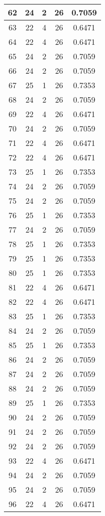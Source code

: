 \documentclass[letterpaper, 12pt]{article}
\begin{document}
\begin{longtable}{|c|c|c|c|c|}
\hline
62 & 24 & 2 & 26 & 0.7059 \\
\hline
63 & 22 & 4 & 26 & 0.6471 \\
\hline
64 & 22 & 4 & 26 & 0.6471 \\
\hline
65 & 24 & 2 & 26 & 0.7059 \\
\hline
66 & 24 & 2 & 26 & 0.7059 \\
\hline
67 & 25 & 1 & 26 & 0.7353 \\
\hline
68 & 24 & 2 & 26 & 0.7059 \\
\hline
69 & 22 & 4 & 26 & 0.6471 \\
\hline
70 & 24 & 2 & 26 & 0.7059 \\
\hline
71 & 22 & 4 & 26 & 0.6471 \\
\hline
72 & 22 & 4 & 26 & 0.6471 \\
\hline
73 & 25 & 1 & 26 & 0.7353 \\
\hline
74 & 24 & 2 & 26 & 0.7059 \\
\hline
75 & 24 & 2 & 26 & 0.7059 \\
\hline
76 & 25 & 1 & 26 & 0.7353 \\
\hline
77 & 24 & 2 & 26 & 0.7059 \\
\hline
78 & 25 & 1 & 26 & 0.7353 \\
\hline
79 & 25 & 1 & 26 & 0.7353 \\
\hline
80 & 25 & 1 & 26 & 0.7353 \\
\hline
81 & 22 & 4 & 26 & 0.6471 \\
\hline
82 & 22 & 4 & 26 & 0.6471 \\
\hline
83 & 25 & 1 & 26 & 0.7353 \\
\hline
84 & 24 & 2 & 26 & 0.7059 \\
\hline
85 & 25 & 1 & 26 & 0.7353 \\
\hline
86 & 24 & 2 & 26 & 0.7059 \\
\hline
87 & 24 & 2 & 26 & 0.7059 \\
\hline
88 & 24 & 2 & 26 & 0.7059 \\
\hline
89 & 25 & 1 & 26 & 0.7353 \\
\hline
90 & 24 & 2 & 26 & 0.7059 \\
\hline
91 & 24 & 2 & 26 & 0.7059 \\
\hline
92 & 24 & 2 & 26 & 0.7059 \\
\hline
93 & 22 & 4 & 26 & 0.6471 \\
\hline
94 & 24 & 2 & 26 & 0.7059 \\
\hline
95 & 24 & 2 & 26 & 0.7059 \\
\hline
96 & 22 & 4 & 26 & 0.6471 \\

\end{longtable}
\end{document}
